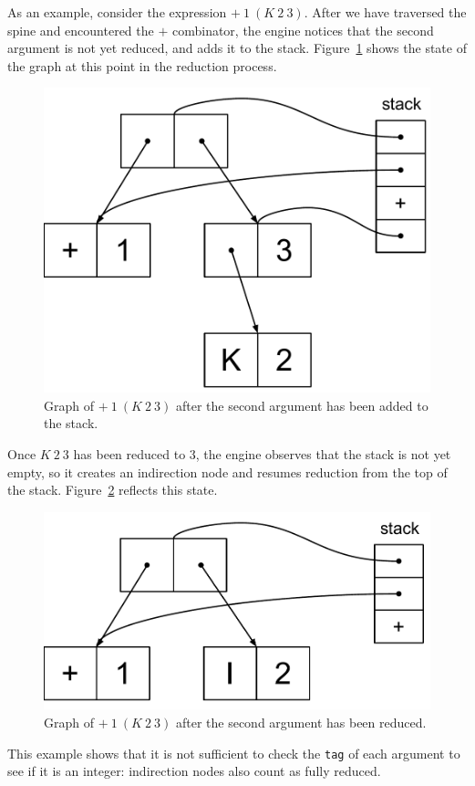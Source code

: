 \documentclass[conference]{IEEEtran}
\begin{document}
As an example, consider the expression $+ \ 1 \ (K \ 2 \ 3)$.
After we have traversed the spine and encountered the $+$ combinator, the engine notices that the second argument is not yet reduced, and adds it to the stack.
Figure~\ref{fig:add_step1} shows the state of the graph at this point in the reduction process.

\begin{figure}
    \includegraphics[width=.6\columnwidth]{add_step1}
    \centering
    \caption{
        Graph of $+ \ 1 \ (K \ 2 \ 3)$ after the second argument has been added to the stack.
    }
    \label{fig:add_step1}
\end{figure}

Once $K \ 2 \ 3$ has been reduced to $3$, the engine observes that the stack is not yet empty, so it creates an indirection node and resumes reduction from the top of the stack.
Figure~\ref{fig:add_step2} reflects this state.

\begin{figure}
    \includegraphics[width=.6\columnwidth]{add_step2}
    \centering
    \caption{
        Graph of $+ \ 1 \ (K \ 2 \ 3)$ after the second argument has been reduced.
    }
    \label{fig:add_step2}
\end{figure}

This example shows that it is not sufficient to check the \texttt{tag} of each argument to see if it is an integer: indirection nodes also count as fully reduced.
\end{document}
